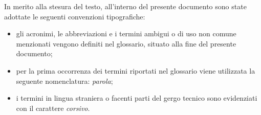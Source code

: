 In merito alla stesura del testo, all'interno del presente documento sono state adottate le seguenti convenzioni tipografiche:
\begin{itemize}
      \item gli acronimi, le abbreviazioni e i termini ambigui o di uso non comune menzionati vengono definiti nel glossario, situato alla fine del presente documento;
      \item per la prima occorrenza dei termini riportati nel glossario viene utilizzata la seguente nomenclatura: \textit{parola}\glox\gloxspacing;
      \item i termini in lingua straniera o facenti parti del gergo tecnico sono evidenziati con il carattere \textit{corsivo}.
\end{itemize}


\newpage